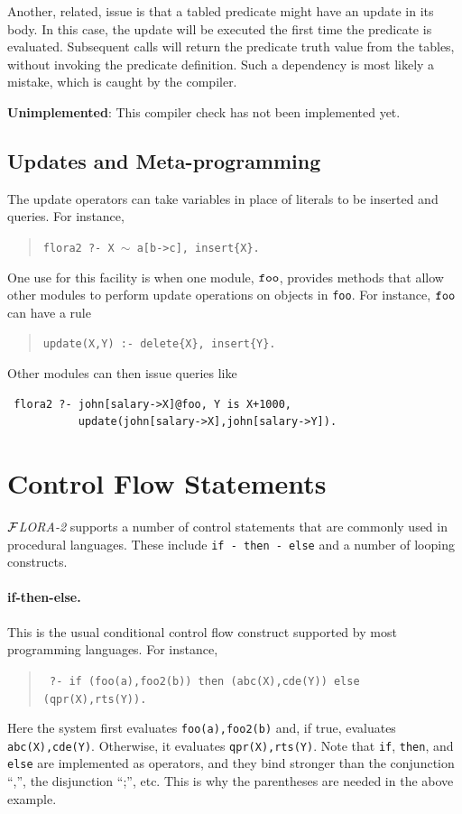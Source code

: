 \documentclass[11pt]{article}
\newcommand{\FLORA}{{\mbox{${\cal F}${\small\it LORA}\rm\emph{-2}}}\xspace}
\begin{document}
Another, related, issue is that a tabled predicate might have an update in
its body. In this case, the update will be executed the first time the
predicate is evaluated. Subsequent calls will return the predicate truth
value from the tables, without invoking the predicate definition.
Such a dependency is most likely a mistake, which is caught by the
compiler.

{\bf Unimplemented}: This compiler check has not been implemented yet.

\subsection{Updates and Meta-programming}

The update operators can take variables in place of literals to be inserted
and queries. For instance, 
\begin{quote}
 {\tt flora2 ?-  X $\sim$ a[b->c], insert\{X\}.}
\end{quote}
One use for this facility is when one module, $\tt foo$, provides methods that
allow other modules to perform update operations on objects in {\tt foo}.
For instance, $\tt foo$ can have a rule
\begin{quote}
 {\tt update(X,Y) :- delete\{X\}, insert\{Y\}.}  
\end{quote}
Other modules can then issue queries like
\begin{verbatim}
 flora2 ?- john[salary->X]@foo, Y is X+1000,
           update(john[salary->X],john[salary->Y]).  
\end{verbatim}

\section{Control Flow Statements}\label{sec:control}

\FLORA supports a number of control statements that are commonly used in
procedural languages. These include {\tt if - then - else} and 
a number of looping constructs.

\paragraph{if-then-else.} This is the usual conditional control flow
construct supported by most programming languages.  For instance,
\begin{quote}
 \tt
 ?- if (foo(a),foo2(b)) then (abc(X),cde(Y)) else (qpr(X),rts(Y)).
\end{quote}
Here the system first evaluates {\tt foo(a),foo2(b)} and, if true,
evaluates {\tt abc(X),cde(Y)}. Otherwise, it evaluates {\tt qpr(X),rts(Y)}.
Note that {\tt if}, {\tt then}, and {\tt else} are implemented as
operators, and they bind stronger than the conjunction ``,'', the
disjunction ``;'', etc. This is why the parentheses are needed in the above
example.
\end{document}
